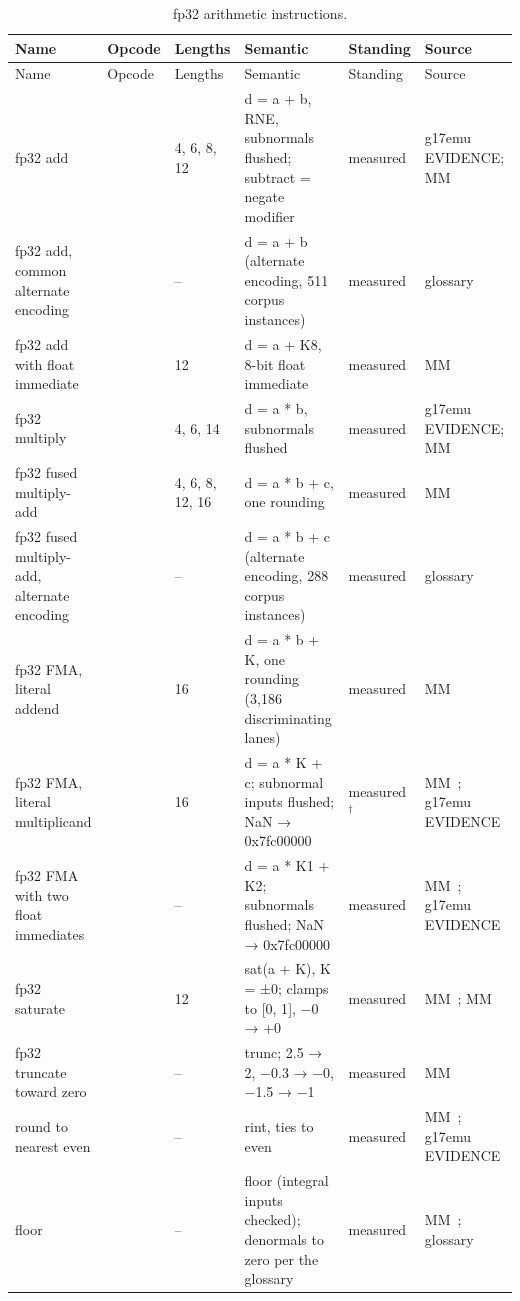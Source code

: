 \widetable
\begin{xltabular}{\linewidth}{@{}>{\hsize}Xll>{\hsize}X>{\hsize}X>{\hsize}X@{}}
\caption{fp32 arithmetic instructions.}\label{tab:scalar-fp32}\\
\toprule
Name & Opcode & Lengths & Semantic & Standing & Source \\
\midrule
\endfirsthead
{}
\toprule
Name & Opcode & Lengths & Semantic & Standing & Source \\
\midrule
\endhead
fp32 add &  & 4, 6, 8, 12 & d = a + b, RNE, subnormals flushed; subtract = negate modifier & measured & g17emu EVIDENCE; MM~ \\
fp32 add, common alternate encoding &  & – & d = a + b (alternate encoding, 511 corpus instances) & measured & glossary \\
fp32 add with float immediate &  & 12 & d = a + K8, 8-bit float immediate & measured & MM~ \\
fp32 multiply &  & 4, 6, 14 & d = a * b, subnormals flushed & measured & g17emu EVIDENCE; MM~ \\
fp32 fused multiply-add &  & 4, 6, 8, 12, 16 & d = a * b + c, one rounding & measured & MM~ \\
fp32 fused multiply-add, alternate encoding &  & – & d = a * b + c (alternate encoding, 288 corpus instances) & measured & glossary \\
fp32 FMA, literal addend &  & 16 & d = a * b + K, one rounding (3,186 discriminating lanes) & measured & MM~ \\
fp32 FMA, literal multiplicand &  & 16 & d = a * K + c; subnormal inputs flushed; NaN → 0x7fc00000 & measured$^\dagger$ & MM~; g17emu EVIDENCE \\
fp32 FMA with two float immediates &  & – & d = a * K1 + K2; subnormals flushed; NaN → 0x7fc00000 & measured & MM~; g17emu EVIDENCE \\
fp32 saturate &  & 12 & sat(a + K), K = ±0; clamps to {[}0, 1{]}, −0 → +0 & measured & MM~; MM~ \\
fp32 truncate toward zero &  & – & trunc; 2.5 → 2, −0.3 → −0, −1.5
→ −1 & measured & MM~ \\
round to nearest even &  & – & rint, ties to even & measured & MM~; g17emu EVIDENCE \\
floor &  & – & floor (integral inputs checked); denormals to zero per the glossary & measured & MM~; glossary \\
\bottomrule
\end{xltabular}

